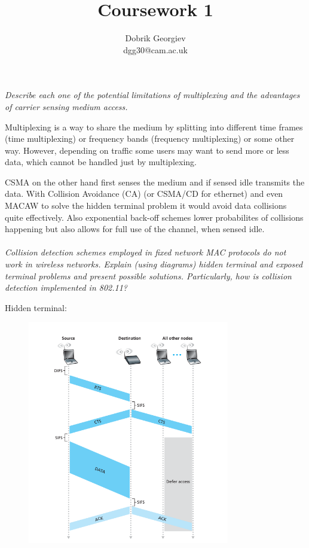 \documentclass[12pt]{article}
\title{Coursework 1}
\author{Dobrik Georgiev \\ \small dgg30@cam.ac.uk}
\newcommand*\circled[1]{\tikz[baseline=(char.base)]{
		\node[shape=circle,draw,inner sep=0pt] (char) {#1};}}
\begin{document}
\maketitle

\textit{\circled{1.} Describe each one of the potential limitations of multiplexing
and the advantages of carrier sensing medium access.}

Multiplexing is a way to share the medium by splitting into different time
frames (time multiplexing) or frequency bands (frequency multiplexing) or some
other way. However, depending on traffic some users may want to send more or
less data, which cannot be handled just by multiplexing.

CSMA on the other hand first senses the medium and if sensed idle transmits the
data. With Collision Avoidance (CA) (or CSMA/CD for ethernet) and even MACAW to
solve the hidden terminal problem it would avoid data collisions quite
effectively. Also exponential back-off schemes lower probabilites of collisions
happening but also allows for full use of the channel, when sensed idle.
\\
\\
\textit{\circled{2.} Collision detection schemes employed in fixed network MAC protocols do not work in wireless
networks. Explain (using diagrams) hidden terminal and exposed terminal problems and present
possible solutions. Particularly, how is collision detection implemented in 802.11?}

Hidden terminal:
\begin{figure}[H]
    \centering
    \includegraphics[width=250pt]{hidden_terminal.png}
\end{figure}
\end{document}
